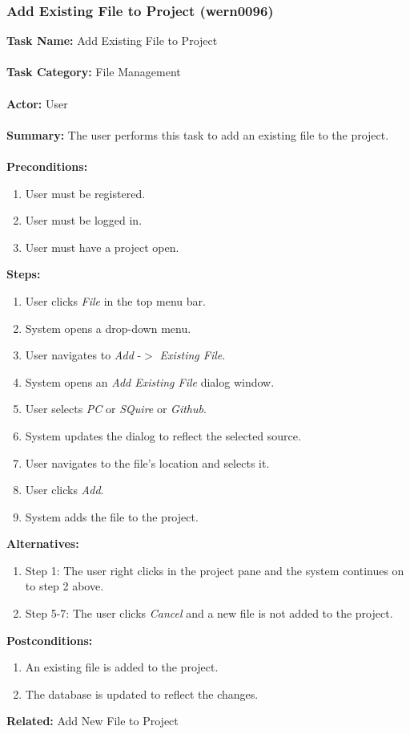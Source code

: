 \documentclass[11pt]{report}
\begin{document}
\newpage

\subsubsection{Add Existing File to Project (wern0096)}
\begin{framed}
	\noindent\textbf{Task Name:} Add Existing File to Project \\ \\
	\textbf{Task Category:} File Management \\ \\
	\textbf{Actor:} User \\ \\
	\textbf{Summary:} The user performs this task to add an existing file to the project. \\ \\
	\textbf{Preconditions:} 
	\begin{enumerate}
		\item User must be registered.
		\item User must be logged in.
		\item User must have a project open.
	\end{enumerate}
	\textbf{Steps:}
	\begin{enumerate}
		\item User clicks \textit{File} in the top menu bar.
		\item System opens a drop-down menu.
		\item User navigates to \textit{Add} -$>$ \textit{Existing File}.
		\item System opens an \textit{Add Existing File} dialog window.
		\item User selects \textit{PC} or \textit{SQuire} or \textit{Github}.
		\item System updates the dialog to reflect the selected source.
		\item User navigates to the file's location and selects it.
		\item User clicks \textit{Add}.
		\item System adds the file to the project.
	\end{enumerate}
	\textbf{Alternatives:} 
	\begin{enumerate}
		\item Step 1: The user right clicks in the project pane and the system continues on to step 2 above.
		\item Step 5-7: The user clicks \textit{Cancel} and a new file is not added to the project.
	\end{enumerate}
	\textbf{Postconditions:}
	\begin{enumerate}
		\item An existing file is added to the project.
		\item The database is updated to reflect the changes.
	\end{enumerate}
	\textbf{Related:} Add New File to Project
\end{framed} 
\end{document}
